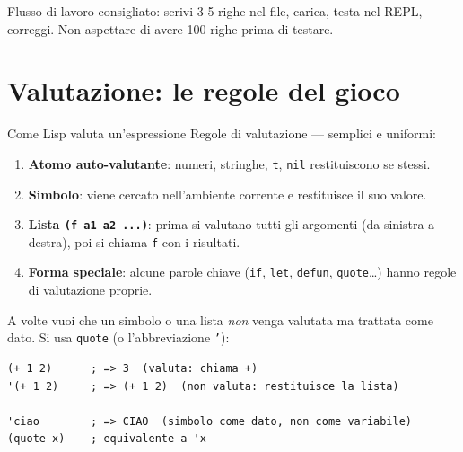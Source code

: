 
\begin{nota}
Flusso di lavoro consigliato: scrivi 3-5 righe nel file, carica,
testa nel REPL, correggi. Non aspettare di avere 100 righe prima
di testare.
\end{nota}

\section{Valutazione: le regole del gioco}

\begin{concetto}{Come Lisp valuta un'espressione}
Regole di valutazione — semplici e uniformi:

\medskip
\begin{enumerate}
  \item \textbf{Atomo auto-valutante}: numeri, stringhe, \texttt{t}, \texttt{nil}
        restituiscono se stessi.
  \item \textbf{Simbolo}: viene cercato nell'ambiente corrente e restituisce
        il suo valore.
  \item \textbf{Lista \texttt{(f a1 a2 ...)}}: prima si valutano tutti gli
        argomenti (da sinistra a destra), poi si chiama \texttt{f} con i risultati.
  \item \textbf{Forma speciale}: alcune parole chiave (\texttt{if}, \texttt{let},
        \texttt{defun}, \texttt{quote}\ldots) hanno regole di valutazione proprie.
\end{enumerate}
\end{concetto}


A volte vuoi che un simbolo o una lista \emph{non} venga valutata
ma trattata come dato. Si usa \texttt{quote} (o l'abbreviazione \texttt{'}):

\begin{esempio}[Quote]
\begin{lstlisting}
(+ 1 2)      ; => 3  (valuta: chiama +)
'(+ 1 2)     ; => (+ 1 2)  (non valuta: restituisce la lista)

'ciao        ; => CIAO  (simbolo come dato, non come variabile)
(quote x)    ; equivalente a 'x
\end{lstlisting}
\end{esempio}

